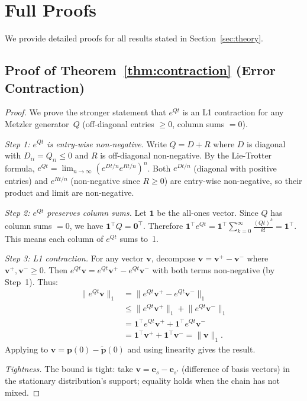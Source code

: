 \documentclass[11pt]{article}
\newcommand{\norm}[1]{\lVert #1 \rVert}
\begin{document}
\appendix

\section{Full Proofs}\label{app:proofs}

We provide detailed proofs for all results stated in
Section~\ref{sec:theory}.

\subsection{Proof of Theorem~\ref{thm:contraction} (Error Contraction)}

\begin{proof}
We prove the stronger statement that $e^{Qt}$ is an L1 contraction
for any Metzler generator~$Q$ (off-diagonal entries $\geq 0$,
column sums $= 0$).

\emph{Step 1: $e^{Qt}$ is entry-wise non-negative.}
Write $Q = D + R$ where $D$ is diagonal with $D_{ii} = Q_{ii} \leq 0$
and $R$ is off-diagonal non-negative.
By the Lie-Trotter formula,
$e^{Qt} = \lim_{n\to\infty}(e^{Dt/n}e^{Rt/n})^n$.
Both $e^{Dt/n}$ (diagonal with positive entries) and $e^{Rt/n}$
(non-negative since $R \geq 0$) are entry-wise non-negative,
so their product and limit are non-negative.

\emph{Step 2: $e^{Qt}$ preserves column sums.}
Let $\mathbf{1}$ be the all-ones vector.
Since $Q$ has column sums $= 0$, we have $\mathbf{1}^\top Q = \mathbf{0}^\top$.
Therefore $\mathbf{1}^\top e^{Qt} = \mathbf{1}^\top \sum_{k=0}^{\infty}
\frac{(Qt)^k}{k!} = \mathbf{1}^\top$.
This means each column of $e^{Qt}$ sums to~1.

\emph{Step 3: L1 contraction.}
For any vector $\mathbf{v}$, decompose $\mathbf{v} = \mathbf{v}^+ - \mathbf{v}^-$
where $\mathbf{v}^+, \mathbf{v}^- \geq 0$.
Then $e^{Qt}\mathbf{v} = e^{Qt}\mathbf{v}^+ - e^{Qt}\mathbf{v}^-$
with both terms non-negative (by Step~1).
Thus:
\begin{align}
  \norm{e^{Qt}\mathbf{v}}_1
  &= \norm{e^{Qt}\mathbf{v}^+ - e^{Qt}\mathbf{v}^-}_1 \nonumber\\
  &\leq \norm{e^{Qt}\mathbf{v}^+}_1 + \norm{e^{Qt}\mathbf{v}^-}_1 \nonumber\\
  &= \mathbf{1}^\top e^{Qt}\mathbf{v}^+ + \mathbf{1}^\top e^{Qt}\mathbf{v}^- \nonumber\\
  &= \mathbf{1}^\top\mathbf{v}^+ + \mathbf{1}^\top\mathbf{v}^-
  = \norm{\mathbf{v}}_1.
\end{align}
Applying to $\mathbf{v} = \mathbf{p}(0) - \tilde{\mathbf{p}}(0)$
and using linearity gives the result.

\emph{Tightness.}
The bound is tight: take $\mathbf{v} = \mathbf{e}_s - \mathbf{e}_{s'}$
(difference of basis vectors) in the stationary distribution's
support; equality holds when the chain has not mixed.
\end{proof}
\end{document}
